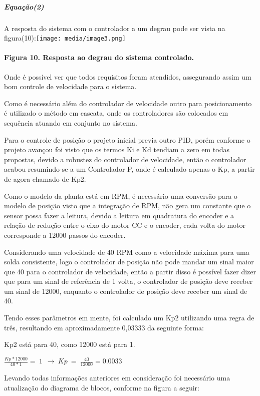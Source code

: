 \documentclass[]{article}
\let\oldparagraph\paragraph
\renewcommand{\paragraph}[1]{\oldparagraph{#1}\mbox{}}
\let\oldsubparagraph\subparagraph
\renewcommand{\subparagraph}[1]{\oldsubparagraph{#1}\mbox{}}
\begin{document}
\subparagraph{Equação(2)}\label{equauxe7uxe3o2}

A resposta do sistema com o controlador a um degrau pode ser vista na
figura(10):\texttt{[image: media/image3.png]}

\paragraph{Figura 10. Resposta ao degrau do sistema
controlado.}\label{figura-10.-resposta-ao-degrau-do-sistema-controlado.}

Onde é possível ver que todos requisitos foram atendidos, assegurando
assim um bom controle de velocidade para o sistema.

Como é necessário além do controlador de velocidade outro para
posicionamento é utilizado o método em cascata, onde os controladores
são colocados em sequência atuando em conjunto no sistema.

Para o controle de posição o projeto inicial previa outro PID, porém
conforme o projeto avançou foi visto que os termos Ki e Kd tendiam a
zero em todas propostas, devido a robustez do controlador de velocidade,
então o controlador acabou resumindo-se a um Controlador P, onde é
calculado apenas o Kp, a partir de agora chamado de Kp2.

Como o modelo da planta está em RPM, é necessário uma conversão para o
modelo de posição visto que a integração de RPM, não gera um constante
que o sensor possa fazer a leitura, devido a leitura em quadratura do
encoder e a relação de redução entre o eixo do motor CC e o encoder,
cada volta do motor corresponde a 12000 passos do encoder.

Considerando uma velocidade de 40 RPM como a velocidade máxima para uma
solda consistente, logo o controlador de posição não pode mandar um
sinal maior que 40 para o controlador de velocidade, então a partir
disso é possível fazer dizer que para um sinal de referência de 1 volta,
o controlador de posição deve receber um sinal de 12000, enquanto o
controlador de posição deve receber um sinal de 40.

Tendo esses parâmetros em mente, foi calculado um Kp2 utilizando uma
regra de três, resultando em aproximadamente 0,03333 da seguinte forma:

Kp2 está para 40, como 12000 está para 1.

\(\frac{Kp*12000}{40*1} = \ 1\ \  \rightarrow \ Kp\  = \ \frac{40}{12000} = 0.0033\)

Levando todas informações anteriores em consideração foi necessário uma
atualização do diagrama de blocos, conforme na figura a seguir:
\end{document}
